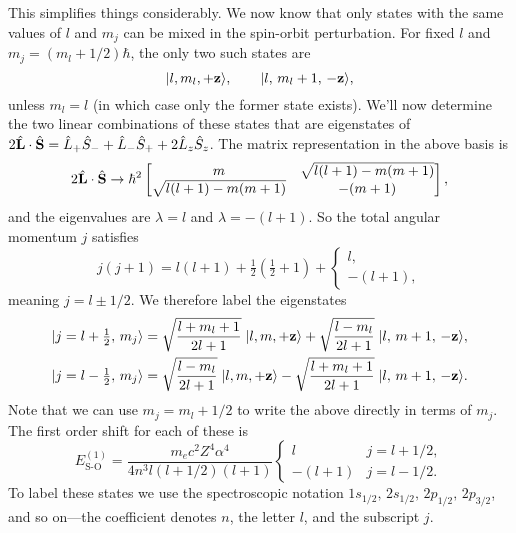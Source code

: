 \documentclass[../p116main.tex]{subfiles}
\begin{document}
This simplifies things considerably.
We now know that only states with the same values of $l$ and $m_j$ can be mixed in the spin-orbit perturbation.
For fixed $l$ and $m_j = (m_l + 1 / 2) \hbar$, the only two such states are
\[ |{l, m_l, +\mathbf{z}}\rangle, \qquad |{l, \, m_l + 1, \, -\mathbf{z}}\rangle, \]
unless $m_l = l$ (in which case only the former state exists).
We'll now determine the two linear combinations of these states that are eigenstates of $2 \hat{\mathbf{L}} \cdot \hat{\mathbf{S}} = \hat L_+ \hat S_- + \hat L_- \hat S_+ + 2 \hat L_z \hat S_z$.
The matrix representation in the above basis is
\[ 2 \hat{\mathbf{L}} \cdot \hat{\mathbf{S}} \to \hbar^2 \begin{bmatrix} m & \sqrt{l(l+1) - m(m+1)} \\ \sqrt{l(l+1) - m(m+1)} & -(m+1) \end{bmatrix}, \]
and the eigenvalues are $\lambda = l$ and $\lambda = -(l+1)$.
So the total angular momentum $j$ satisfies
\[ j(j+1) = l(l+1) + \tfrac{1}{2} (\tfrac{1}{2} + 1) + \begin{cases} l, \\ -(l+1), \end{cases} \]
meaning $j = l \pm 1 / 2$.
We therefore label the eigenstates
\begin{align*}
    |{j = l + \tfrac{1}{2}, \, m_j}\rangle &= \sqrt{\frac{l + m_l + 1}{2l + 1}} \; |{l, m, +\mathbf{z}}\rangle + \sqrt{\frac{l - m_l}{2l + 1}} \; |{l, \, m+1, \, -\mathbf{z}}\rangle, \\
    |{j = l - \tfrac{1}{2}, \, m_j}\rangle &= \sqrt{\frac{l - m_l}{2l + 1}} \; |{l, m, +\mathbf{z}}\rangle - \sqrt{\frac{l + m_l + 1}{2l + 1}} \; |{l, \, m+1, \, -\mathbf{z}}\rangle.
\end{align*}
Note that we can use $m_j = m_l + 1 / 2$ to write the above directly in terms of $m_j$.
The first order shift for each of these is
\[ E_\textrm{S-O}^{(1)} = \frac{m_e c^2 Z^{4} \alpha^{4}}{4n^3 l(l + 1 / 2)(l+1)} \begin{cases} l & j = l + 1 / 2, \\ -(l+1) & j = l - 1 / 2. \end{cases} \]
To label these states we use the spectroscopic notation $1s_{1 / 2}, \, 2s_{1 / 2}, \, 2p_{1 / 2}, \, 2p_{3 / 2}$, and so on---the coefficient denotes $n$, the letter $l$, and the subscript $j$.
\end{document}
